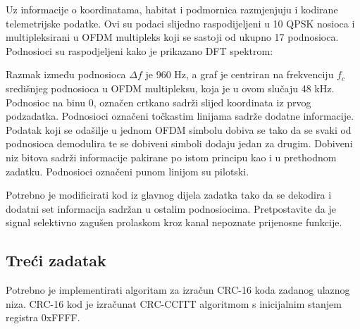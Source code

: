 \documentclass[a4paper]{article}
\begin{document}
Uz informacije o koordinatama, habitat i podmornica razmjenjuju i kodirane telemetrijske podatke. Ovi su podaci slijedno raspodijeljeni u 10 QPSK nosioca i multipleksirani u OFDM  multipleks koji se sastoji od ukupno 17 podnosioca. Podnosioci su raspodjeljeni kako je prikazano DFT spektrom:
\begin{figure}[h!]
	\centering
\end{figure}
Razmak između podnosioca $\varDelta f$ je 960 Hz, a graf je centriran na frekvenciju $f_c$ središnjeg podnosioca u OFDM multipleksu, koja je u ovom slučaju 48 kHz. Podnosioc na binu 0, označen crtkano sadrži slijed koordinata iz prvog podzadatka. Podnosioci označeni točkastim linijama sadrže dodatne informacije. Podatak koji se odašilje u jednom OFDM simbolu dobiva se tako da se svaki od podnosioca demodulira te se dobiveni simboli dodaju jedan za drugim. Dobiveni niz bitova sadrži informacije pakirane po istom principu kao i u prethodnom zadatku. Podnosioci označeni punom linijom su pilotski.

Potrebno je modificirati kod iz glavnog dijela zadatka tako da se dekodira i dodatni set informacija sadržan u ostalim podnosiocima. Pretpostavite da je signal selektivno zagušen prolaskom kroz kanal nepoznate prijenosne funkcije.

\subsection{Treći zadatak}
Potrebno je implementirati algoritam za izračun CRC-16 koda zadanog ulaznog niza. CRC-16 kod je izračunat CRC-CCITT algoritmom s inicijalnim stanjem registra 0xFFFF.
\end{document}
